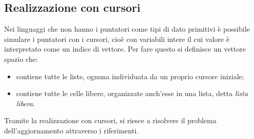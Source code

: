 \documentclass[12pt]{report}
\begin{document}
	\subsection{Realizzazione con cursori}
	Nei linguaggi che non hanno i puntatori come tipi di dato primitivi è possibile simulare i puntatori con i cursori, cioè con variabili intere il cui valore è interpretato come un indice di vettore. Per fare questo si definisce un vettore spazio che:
	\begin{itemize}
		\item contiene tutte le liste, ognuna individuata da un proprio cursore iniziale;
		\item contiene tutte le celle libere, organizzate anch'esse in una lista, detta \textit{lista libera}.
	\end{itemize}
	Tramite la realizzazione con cursori, si riesce a risolvere il problema dell'aggiornamento attraverso i riferimenti.
\end{document}
